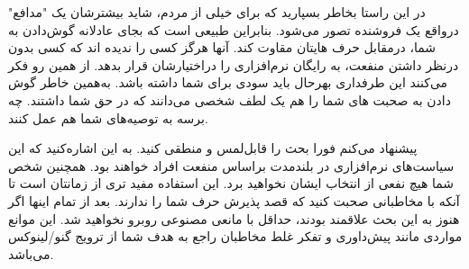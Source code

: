 در این راستا بخاطر بسپارید که برای خیلی از مردم، شاید بیشترشان
یک "مدافع" درواقع یک فروشنده تصور می‌شود. بنابراین طبیعی است
که بجای عادلانه گوش‌دادن به شما، درمقابل حرف هایتان مقاوت کند.
آنها هرگز کسی را ندیده اند که کسی بدون درنظر داشتن منفعت، به رایگان
نرم‌افزاری را دراختیارشان قرار بدهد. از همین رو فکر می‌کنند این طرفداری
بهرحال باید سودی برای شما داشته باشد. به‌همین خاطر گوش دادن به صحبت های
شما را هم یک لطف شخصی می‌دانند که در حق شما داشتند. چه برسه به توصیه‌های
شما هم عمل کنند.

پیشنهاد می‌کنم فورا بحث را قابل‌لمس و منطقی کنید. به این اشاره‌کنید
که این سیاست‌های نرم‌افزاری در بلندمدت براساس منفعت افراد خواهند بود.
همچنین شخص شما هیچ نفعی از انتخاب ایشان نخواهید برد. این استفاده
مفید تری از زمانتان است تا آنکه با مخاطبانی صحبت کنید که قصد پذیرش
حرف شما را ندارند. بعد از تمام اینها اگر هنوز به این بحث علاقمند بودند،
حداقل با مانعی مصنوعی روبرو نخواهید شد. این موانع مواردی مانند پیش‌داوری
و تفکر غلط مخاطبان راجع به هدف شما از ترویج گنو/لینوکس می‌باشد.

